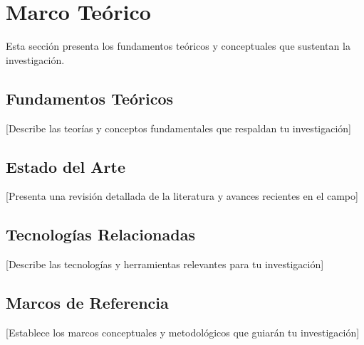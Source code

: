 \section{Marco Teórico}

Esta sección presenta los fundamentos teóricos y conceptuales que sustentan la investigación.

\subsection{Fundamentos Teóricos}
[Describe las teorías y conceptos fundamentales que respaldan tu investigación]

\subsection{Estado del Arte}
[Presenta una revisión detallada de la literatura y avances recientes en el campo]

\subsection{Tecnologías Relacionadas}
[Describe las tecnologías y herramientas relevantes para tu investigación]

\subsection{Marcos de Referencia}
[Establece los marcos conceptuales y metodológicos que guiarán tu investigación]